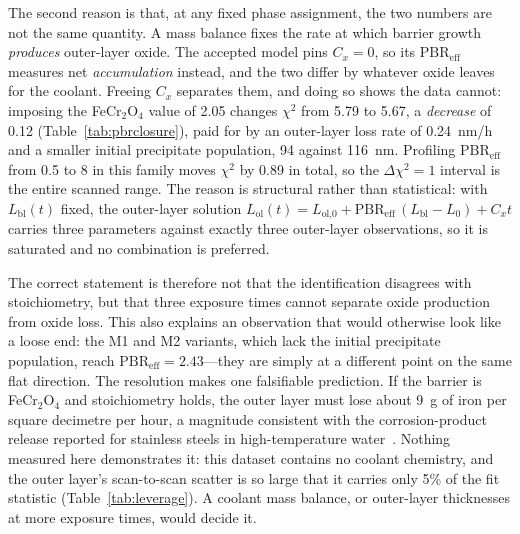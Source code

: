 \documentclass[preprint,12pt]{elsarticle}
\begin{document}
The second reason is that, at any fixed phase assignment, the two
numbers are not the same quantity. A mass balance fixes the rate at
which barrier growth \emph{produces} outer-layer oxide. The accepted
model pins $C_x = 0$, so its $\mathrm{PBR}_\text{eff}$ measures net
\emph{accumulation} instead, and the two differ by whatever oxide leaves
for the coolant. Freeing $C_x$ separates them, and doing so shows the
data cannot: imposing the FeCr$_2$O$_4$ value of 2.05 changes $\chi^2$
from 5.79 to 5.67, a \emph{decrease} of 0.12
(Table~\ref{tab:pbrclosure}), paid for by an outer-layer loss rate of
0.24~nm/h and a smaller initial precipitate population, 94 against
116~nm. Profiling $\mathrm{PBR}_\text{eff}$ from 0.5 to 8 in this family
moves $\chi^2$ by 0.89 in total, so the $\Delta\chi^2 = 1$ interval is
the entire scanned range. The reason is structural rather than
statistical: with $L_\text{bl}(t)$ fixed, the outer-layer solution
$L_\text{ol}(t) = L_\text{ol,0} + \mathrm{PBR}_\text{eff}\,
(L_\text{bl} - L_0) + C_x t$ carries three parameters against exactly
three outer-layer observations, so it is saturated and no combination is
preferred.

The correct statement is therefore not that the identification
disagrees with stoichiometry, but that three exposure times cannot
separate oxide production from oxide loss. This also explains an
observation that would otherwise look like a loose end: the M1 and M2
variants, which lack the initial precipitate population, reach
$\mathrm{PBR}_\text{eff} = 2.43$---they are simply at a different point
on the same flat direction. The resolution makes one falsifiable
prediction. If the barrier is FeCr$_2$O$_4$ and stoichiometry holds,
the outer layer must lose about 9~\textmu g of iron per square decimetre
per hour, a magnitude consistent with the corrosion-product release
reported for stainless steels in high-temperature
water~\citep{lister1987release}. Nothing measured here demonstrates it:
this dataset contains no coolant chemistry, and the outer layer's
scan-to-scan scatter is so large that it carries only 5\% of the fit
statistic (Table~\ref{tab:leverage}). A coolant mass balance, or
outer-layer thicknesses at more exposure times, would decide it.
\end{document}
